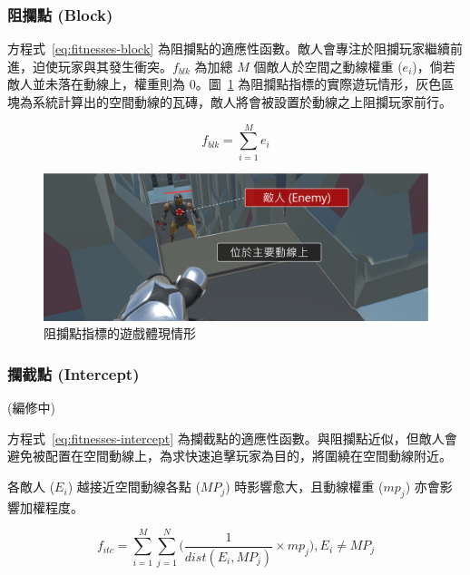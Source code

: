 \subsubsection{阻攔點 (Block)}
\label{sssec:method-segments-fitnesses-block}

方程式~\ref{eq:fitnesses-block} 為阻攔點的適應性函數。敵人會專注於阻攔玩家繼續前進，迫使玩家與其發生衝突。$f_{blk}$ 為加總 $M$ 個敵人於空間之動線權重 ($e_{i}$)，倘若敵人並未落在動線上，權重則為 0。圖~\ref{fig:fitnesses-block-gameplay} 為阻攔點指標的實際遊玩情形，灰色區塊為系統計算出的空間動線的瓦磚，敵人將會被設置於動線之上阻攔玩家前行。

\begin{equation}
    \label{eq:fitnesses-block}
    f_{blk} = \sum_{i=1}^{M} e_{i}
\end{equation}

\begin{figure}[ht]
  \begin{center}
    \includegraphics[width=1.0\textwidth]{figures/fitnesses-block-gameplay.png}
    \caption{阻攔點指標的遊戲體現情形}
    \label{fig:fitnesses-block-gameplay}
  \end{center}
\end{figure}

\subsubsection{攔截點 (Intercept)}
\label{sssec:method-segments-fitnesses-intercept}

(編修中)

方程式~\ref{eq:fitnesses-intercept} 為攔截點的適應性函數。與阻攔點近似，但敵人會避免被配置在空間動線上，為求快速追擊玩家為目的，將圍繞在空間動線附近。


各敵人 ($E_{i}$) 越接近空間動線各點 ($MP_{j}$) 時影響愈大，且動線權重 ($mp_{j}$) 亦會影響加權程度。

\begin{equation}
    \label{eq:fitnesses-intercept}
    f_{itc} = \sum_{i=1}^{M} \sum_{j=1}^{N} \Big( \frac{1}{dist(E_{i}, MP_{j})} \times mp_{j} \Big), 
    E_{i} \neq MP_{j}
\end{equation}

